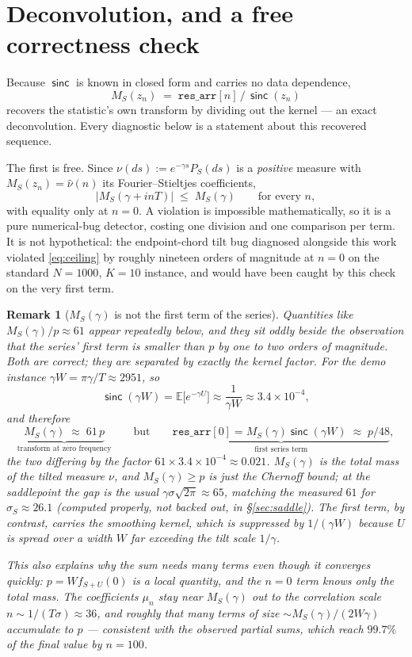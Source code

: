 \documentclass[11pt]{article}
\newtheorem{remark}{Remark}
\newcommand{\sinck}{\operatorname{\mathsf{sinc}}}
\begin{document}
\section{Deconvolution, and a free correctness check}
\label{sec:deconv}

Because $\sinck$ is known in closed form and carries no data dependence,
\[
  M_S(z_n)\;=\;\texttt{res\_arr}[n]\,/\,\sinck(z_n)
\]
recovers the statistic's own transform by dividing out the kernel — an exact deconvolution. Every
diagnostic below is a statement about this recovered sequence.


The first is free. Since $\nu(ds):=e^{-\gamma s}P_S(ds)$ is a \emph{positive} measure with
$M_S(z_n)=\hat\nu(n)$ its Fourier--Stieltjes coefficients,
\begin{equation}
  \label{eq:ceiling}
  |M_S(\gamma+inT)|\;\le\;M_S(\gamma)\qquad\text{for every }n,
\end{equation}
with equality only at $n=0$. A violation is impossible mathematically, so it is a pure numerical-bug
detector, costing one division and one comparison per term. It is not hypothetical: the
endpoint-chord tilt bug diagnosed alongside this work violated \eqref{eq:ceiling} by roughly
nineteen orders of magnitude at $n=0$ on the standard $N{=}1000$, $K{=}10$ instance, and would have
been caught by this check on the very first term.

\begin{remark}[$M_S(\gamma)$ is not the first term of the series]
\label{rem:notfirstterm}
Quantities like $M_S(\gamma)/p\approx61$ appear repeatedly below, and they sit oddly beside the
observation that the series' first term is \emph{smaller} than $p$ by one to two orders of
magnitude. Both are correct; they are separated by exactly the kernel factor. For the demo instance
$\gamma W=\pi\gamma/T\approx2951$, so
\[
  \sinck(\gamma W)=\mathbb E\big[e^{-\gamma U}\big]\approx\frac1{\gamma W}\approx3.4\times10^{-4},
\]
and therefore
\[
  \underbrace{M_S(\gamma)\;\approx\;61\,p}_{\text{transform at zero frequency}}
  \qquad\text{but}\qquad
  \underbrace{\texttt{res\_arr}[0]=M_S(\gamma)\sinck(\gamma W)\;\approx\;p/48}_{\text{first series term}} ,
\]
the two differing by the factor $61\times3.4\times10^{-4}\approx0.021$. $M_S(\gamma)$ is the total
mass of the tilted measure $\nu$, and $M_S(\gamma)\ge p$ is just the Chernoff bound; at the
saddlepoint the gap is the usual $\gamma\sigma\sqrt{2\pi}\approx65$, matching the measured $61$ for
$\sigma_S\approx26.1$ (computed properly, not backed out, in \S\ref{sec:saddle}). The first \emph{term}, by contrast, carries the smoothing kernel, which is
suppressed by $1/(\gamma W)$ because $U$ is spread over a width $W$ far exceeding the tilt scale
$1/\gamma$.

This also explains why the sum needs many terms even though it converges quickly: $p=Wf_{S+U}(0)$
is a \emph{local} quantity, and the $n=0$ term knows only the total mass. The coefficients $\mu_n$
stay near $M_S(\gamma)$ out to the correlation scale $n\sim1/(T\sigma)\approx36$, and roughly that
many terms of size $\sim M_S(\gamma)/(2W\gamma)$ accumulate to $p$ --- consistent with the observed
partial sums, which reach $99.7\%$ of the final value by $n=100$.
\end{remark}
\end{document}
